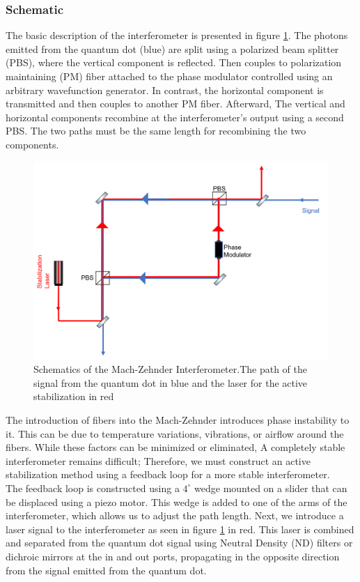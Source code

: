 \subsubsection{Schematic}
The basic description of the interferometer is presented in figure \ref{fig:Mach_zhender}. The photons emitted from the quantum dot (blue) are split using a polarized beam splitter (PBS), where the vertical component is reflected. Then couples to polarization maintaining (PM) fiber attached to the phase modulator controlled using an arbitrary wavefunction generator. In contrast, the horizontal component is transmitted and then couples to another PM fiber. Afterward, The vertical and horizontal components recombine at the interferometer's output using a second PBS. The two paths must be the same length for recombining the two components.
\begin{figure}[H]
		\centering
		\includegraphics[scale=0.70]{figures/Mach_Zhender Interferometer.png}
		\caption{Schematics of the Mach-Zehnder Interferometer.The path of the signal from the quantum dot in blue and the laser for the active stabilization in red}
		\label{fig:Mach_zhender}
	\end{figure}
 The introduction of fibers into the Mach-Zehnder introduces phase instability to it. This can be due to temperature variations, vibrations, or airflow around the fibers. While these factors can be minimized or eliminated, A completely stable interferometer remains difficult; Therefore, we must construct an active stabilization method using a feedback loop for a more stable interferometer.\\
 The feedback loop is constructed using a $4^{\circ}$ wedge mounted on a slider that can be displaced using a piezo motor. This wedge is added to one of the arms of the interferometer, which allows us to adjust the path length. Next, we introduce a laser signal to the interferometer as seen in figure \ref{fig:Mach_zhender} in red. This laser is combined and separated from the quantum dot signal using Neutral Density (ND) filters or dichroic mirrors at the in and out ports, propagating in the opposite direction from the signal emitted from the quantum dot. \\
